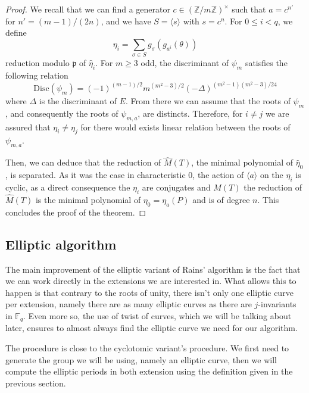 \documentclass[12pt]{article}
\theoremstyle{plain}
\theoremstyle{definition}
\def\Z{\ensuremath{\mathbb{Z}}}
\def\F{\ensuremath{\mathbb{F}}}
\newcounter{algorithm}
\begin{document}
\begin{proof}
We recall that we can find a generator $c\in(\Z/m\Z)^{\times}$ such that $a =
c^{n'}$ for $n' = (m-1)/(2n)$, and we have $S = \langle{s}\rangle$ with $s =
c^n$. For $0\leq i < q$, we define 
\begin{equation}
\eta_i = \sum_{\sigma\in S}{g_{\sigma}(g_{a^i}(\theta))}
\end{equation}
reduction modulo $\mathfrak{p}$ of $\widehat{\eta}_i$. For $m\geq3$ odd, the
discriminant of $\psi_m$ satisfies the following relation
\begin{equation}
\text{Disc}(\psi_m) = (-1)^{(m-1)/2}m^{(m^2 - 3)/2}(-\Delta)^{(m^2 - 1)(m^2 -
3)/24}
\end{equation}
where $\Delta$ is the discriminant of $E$. From there we can assume that the
roots of $\psi_m$, and consequently the roots of $\psi_{m,a}$, are
distincts. Therefore, for $i\neq j$ we are assured that $\eta_i\neq\eta_j$ for
there would exists linear relation between the roots of $\psi_{m,a}$.

Then, we can deduce that the reduction of $\widehat{M}(T)$, the minimal
polynomial of $\widehat{\eta}_0$, is separated. As it was the case in
characteristic $0$, the action of $\langle{a}\rangle$ on the $\eta_i$ is cyclic,
as a direct consequence the $\eta_i$ are conjugates and $M(T)$ the reduction of
$\widehat{M}(T)$ is the minimal polynomial of $\eta_0 = \eta_a(P)$ and is of
degree $n$. This concludes the proof of the theorem.

\end{proof}

\subsection{Elliptic algorithm}

The main improvement of the elliptic variant of Rains' algorithm is the fact
that we can work directly in the extensions we are interested in. What allows
this to happen is that contrary to the roots of unity, there isn't only one
elliptic curve per extension, namely there are as many elliptic curves as there
are $j$-invariants in $\F_q$. Even more so, the use of twist of curves, which we
will be talking about later, ensures to almost always find the elliptic curve we
need for our algorithm.

The procedure is close to the cyclotomic variant's procedure. We first need to
generate the group we will be using, namely an elliptic curve, then we will
compute the elliptic periods in both extension using the definition given in the
previous section.\\
\end{document}
